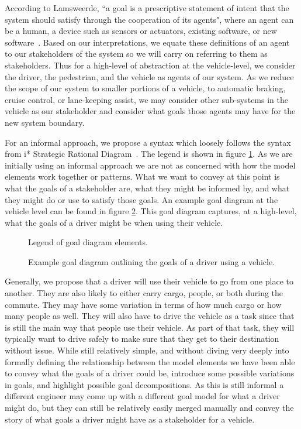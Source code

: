 According to Lamsweerde, ``a goal is a prescriptive statement of intent that the system should satisfy through the cooperation of its agents", where an agent can be a human, a device such as sensors or actuators, existing software, or new software~\cite{lamsweerde2009requirements}. Based on our interpretations, we equate these definitions of an agent to our stakeholders of the system so we will carry on referring to them as stakeholders. Thus for a high-level of abstraction at the vehicle-level, we consider the driver, the pedestrian, and the vehicle as agents of our system. As we reduce the scope of our system to smaller portions of a vehicle, to automatic braking, cruise control, or lane-keeping assist, we may consider other sub-systems in the vehicle as our stakeholder and consider what goals those agents may have for the new system boundary.

For an informal approach, we propose a syntax which loosely follows the syntax from i* Strategic Rational Diagram~\cite{wautelet2016building, lopez2012specialization}. The legend is shown in figure \ref{fig:legend}. As we are initially using an informal approach we are not as concerned with how the model elements work together or patterns. What we want to convey at this point is what the goals of a stakeholder are, what they might be informed by, and what they might do or use to satisfy those goals. An example goal diagram at the vehicle level can be found in figure \ref{fig:goal_diagram_example}. This goal diagram captures, at a high-level, what the goals of a driver might be when using their vehicle. 

\begin{figure}
	\centering
	
	\caption{Legend of goal diagram elements.}
	\label{fig:legend}
\end{figure}

\begin{figure}
	\centering
	
	\caption{Example goal diagram outlining the goals of a driver using a vehicle.}
	\label{fig:goal_diagram_example}
\end{figure}

Generally, we propose that a driver will use their vehicle to go from one place to another. They are also likely to either carry cargo, people, or both during the commute. They may have some variation in terms of how much cargo or how many people as well. They will also have to drive the vehicle as a task since that is still the main way that people use their vehicle. As part of that task, they will typically want to drive safely to make sure that they get to their destination without issue. While still relatively simple, and without diving very deeply into formally defining the relationship between the model elements we have been able to convey what the goals of a driver could be, introduce some possible variations in goals, and highlight possible goal decompositions. As this is still informal a different engineer may come up with a different goal model for what a driver might do, but they can still be relatively easily merged manually and convey the story of what goals a driver might have as a stakeholder for a vehicle.

